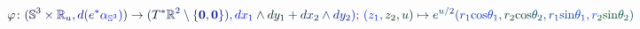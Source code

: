\documentclass[12pt]{article}
\begin{document}
\makeatletter
\renewcommand*{\@textcolor}[3]{%
  \protect\leavevmode
  \begingroup
    \color#1{#2}#3%
  \endgroup
}
\makeatother
\begin{displaymath}
\mathcolor[RGB]{0,0,15}{\varphi} \mathcolor[RGB]{0,0,30}{\colon} \mathcolor[RGB]{0,0,45}{(} \mathbb { \mathcolor[RGB]{0,0,60}{S} } ^ { \mathcolor[RGB]{0,0,75}{3} } \mathcolor[RGB]{0,0,90}{\times} \mathbb { \mathcolor[RGB]{0,0,105}{R} } _ { \mathcolor[RGB]{0,0,120}{u} } \mathcolor[RGB]{0,0,135}{,} \mathcolor[RGB]{0,0,150}{d} \mathcolor[RGB]{0,0,165}{(} \mathcolor[RGB]{0,0,180}{e} ^ { \mathcolor[RGB]{0,0,195}{*} } \mathcolor[RGB]{0,0,210}{\alpha} _ { \mathbb { \mathcolor[RGB]{0,0,225}{S} } ^ { \mathcolor[RGB]{0,0,240}{3} } } \mathcolor[RGB]{0,0,255}{)} \mathcolor[RGB]{0,15,0}{)} \mathcolor[RGB]{0,15,15}{\to} \mathcolor[RGB]{0,15,30}{(} \mathcolor[RGB]{0,15,45}{T} ^ { \mathcolor[RGB]{0,15,60}{*} } \mathbb { \mathcolor[RGB]{0,15,75}{R} } ^ { \mathcolor[RGB]{0,15,90}{2} } \mathcolor[RGB]{0,15,105}{\setminus} \mathcolor[RGB]{0,15,120}{\{} \boldsymbol { \mathcolor[RGB]{0,15,135}{0} } \mathcolor[RGB]{0,15,150}{,} \boldsymbol { \mathcolor[RGB]{0,15,165}{0} } \mathcolor[RGB]{0,15,180}{\}} \mathcolor[RGB]{0,15,195}{)} \mathcolor[RGB]{0,15,210}{,} \mathcolor[RGB]{0,15,225}{d} \mathcolor[RGB]{0,15,240}{x} _ { \mathcolor[RGB]{0,15,255}{1} } \mathcolor[RGB]{0,30,0}{\wedge} \mathcolor[RGB]{0,30,15}{d} \mathcolor[RGB]{0,30,30}{y} _ { \mathcolor[RGB]{0,30,45}{1} } \mathcolor[RGB]{0,30,60}{+} \mathcolor[RGB]{0,30,75}{d} \mathcolor[RGB]{0,30,90}{x} _ { \mathcolor[RGB]{0,30,105}{2} } \mathcolor[RGB]{0,30,120}{\wedge} \mathcolor[RGB]{0,30,135}{d} \mathcolor[RGB]{0,30,150}{y} _ { \mathcolor[RGB]{0,30,165}{2} } \mathcolor[RGB]{0,30,180}{)} \mathcolor[RGB]{0,30,195}{;} \mathcolor[RGB]{0,30,210}{\,
(} \mathcolor[RGB]{0,30,225}{z} _ { \mathcolor[RGB]{0,30,240}{1} } \mathcolor[RGB]{0,30,255}{,} \mathcolor[RGB]{0,45,0}{z} _ { \mathcolor[RGB]{0,45,15}{2} } \mathcolor[RGB]{0,45,30}{,} \mathcolor[RGB]{0,45,45}{u} \mathcolor[RGB]{0,45,60}{)} \mathcolor[RGB]{0,45,75}{\mapsto} \mathcolor[RGB]{0,45,90}{e} ^ { \mathcolor[RGB]{0,45,105}{u} \mathcolor[RGB]{0,45,120}{/} \mathcolor[RGB]{0,45,135}{2} } \mathcolor[RGB]{0,45,150}{(} \mathcolor[RGB]{0,45,165}{r} _ { \mathcolor[RGB]{0,45,180}{1} } \mathrm { \mathcolor[RGB]{0,45,195}{c} \mathcolor[RGB]{0,45,210}{o} \mathcolor[RGB]{0,45,225}{s} } \mathcolor[RGB]{0,45,240}{\theta} _ { \mathcolor[RGB]{0,45,255}{1} } \mathcolor[RGB]{0,60,0}{,} \mathcolor[RGB]{0,60,15}{r} _ { \mathcolor[RGB]{0,60,30}{2} } \mathrm { \mathcolor[RGB]{0,60,45}{c} \mathcolor[RGB]{0,60,60}{o} \mathcolor[RGB]{0,60,75}{s} } \mathcolor[RGB]{0,60,90}{\theta} _ { \mathcolor[RGB]{0,60,105}{2} } \mathcolor[RGB]{0,60,120}{,} \mathcolor[RGB]{0,60,135}{r} _ { \mathcolor[RGB]{0,60,150}{1} } \mathrm { \mathcolor[RGB]{0,60,165}{s} \mathcolor[RGB]{0,60,180}{i} \mathcolor[RGB]{0,60,195}{n} } \mathcolor[RGB]{0,60,210}{\theta} _ { \mathcolor[RGB]{0,60,225}{1} } \mathcolor[RGB]{0,60,240}{,} \mathcolor[RGB]{0,60,255}{r} _ { \mathcolor[RGB]{0,75,0}{2} } \mathrm { \mathcolor[RGB]{0,75,15}{s} \mathcolor[RGB]{0,75,30}{i} \mathcolor[RGB]{0,75,45}{n} } \mathcolor[RGB]{0,75,60}{\theta} _ { \mathcolor[RGB]{0,75,75}{2} } \mathcolor[RGB]{0,75,90}{)}
\end{displaymath}
\end{document}
